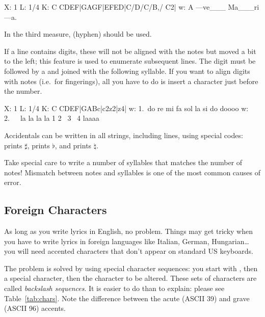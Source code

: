 \documentclass[a4paper,12pt]{book}
\begin{document}
\begin{abcsource}
X: 1
L: 1/4
K: C
CDEF|GAGF|EFED|C/D/C/B,/ C2|
w: A ---ve___ Ma___ri ---a.
\end{abcsource}


In the third measure, \car{-} (hyphen) should be used.

If a  line contains digits, these will not be aligned with
the notes but moved a bit to the left; this feature is used to
enumerate subsequent  lines. The digit must be followed by a
\car{\textasciitilde} and joined with the following syllable. If you
want to align digits with notes (i.e.\ for fingerings), all you have
to do is insert a \car{\textasciitilde} character just before the
number.

\begin{abcsource}
X: 1
L: 1/4
K: C
CDEF|GABc|c2z2|z4|
w: 1.~do re mi fa sol la si do doooo
w: 2.~~~la la la la 1 2 ~3 ~4 laaaa
\end{abcsource}


Accidentals can be written in all strings, including  lines,
using special codes:  prints $\sharp$,  prints
$\flat$, and  prints $\natural$.

\begin{vimp}

  Take special care to write a number of syllables that matches the
  number of notes! Mismatch between notes and syllables is one of the
  most common causes of error.

\end{vimp}


\subsection{Foreign Characters}

As long as you write lyrics in English, no problem. Things may get
tricky when you have to write lyrics in foreign languages like
Italian, German, Hungarian{\ldots} you will need accented characters
that don't appear on standard US keyboards.

The problem is solved by using special character sequences: you start
with \car{\bl}, then a special character, then the character to be
altered. These sets of characters are called \emph{backslash
sequences}. It is easier to do than to explain: please see
Table~\ref{tab:chars}. Note the difference between the acute 
(ASCII 39) and grave  (ASCII 96) accents.
\end{document}
